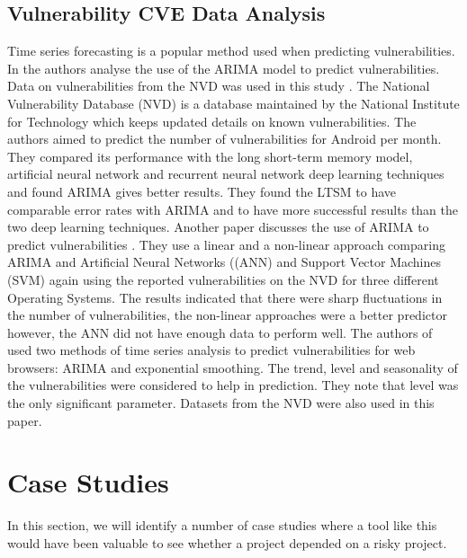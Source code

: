 \documentclass[conference]{IEEEtran}
\begin{document}
\subsection{Vulnerability CVE Data Analysis}
Time series forecasting is a popular method used when predicting vulnerabilities. In \cite{gencer_time_2021} the authors analyse the use of the ARIMA model to predict vulnerabilities. Data on vulnerabilities from the NVD was used in this study \cite{noauthor_vulnerability_nodate}. The National Vulnerability Database (NVD) is a database maintained by the National Institute for Technology which keeps updated details on known vulnerabilities. The authors aimed to predict the number of vulnerabilities for Android per month. They compared its performance with the long short-term memory model, artificial neural network and recurrent neural network deep learning techniques and found ARIMA gives better results. They found the LTSM to have comparable error rates with ARIMA and to have more successful results than the two deep learning techniques. Another paper discusses the use of ARIMA to predict vulnerabilities \cite{pokhrel_cybersecurity_2017}. They use a linear and a non-linear approach comparing ARIMA and Artificial Neural Networks ((ANN) and Support Vector Machines (SVM) again using the reported vulnerabilities on the NVD for three different Operating Systems. The results indicated that there were sharp fluctuations in the number of vulnerabilities, the non-linear approaches were a better predictor however, the ANN did not have enough data to perform well. The authors of \cite{roumani_time_2015} used two methods of time series analysis to predict vulnerabilities for web browsers: ARIMA and exponential smoothing. The trend, level and seasonality of the vulnerabilities were considered to help in prediction. They note that level was the only significant parameter. Datasets from the NVD were also used in this paper.

\section{Case Studies}
In this section, we will identify a number of case studies where a tool like this would have been valuable to see whether a project depended on a risky project. 
\end{document}
